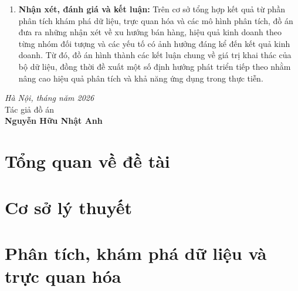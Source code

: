 \documentclass[oneside, a4paper]{book}
\theoremstyle{plain}
\theoremstyle{plain}
\theoremstyle{remark}
\theoremstyle{definition}
\theoremstyle{remark}
\begin{document}
\begin{enumerate}
		\item \textbf{Nhận xét, đánh giá và kết luận:} Trên cơ sở tổng hợp kết quả từ phần phân tích khám phá dữ liệu, trực quan hóa và các mô hình phân tích, đồ án đưa ra những nhận xét về xu hướng bán hàng, hiệu quả kinh doanh theo từng nhóm đối tượng và các yếu tố có ảnh hưởng đáng kể đến kết quả kinh doanh. Từ đó, đồ án hình thành các kết luận chung về giá trị khai thác của bộ dữ liệu, đồng thời đề xuất một số định hướng phát triển tiếp theo nhằm nâng cao hiệu quả phân tích và khả năng ứng dụng trong thực tiễn.
	\end{enumerate}
	
	
	
	\begin{minipage}{0.5\textwidth}
	\end{minipage}
	\hspace{0.5\textwidth}
	\begin{minipage}{0.5\textwidth}
		\noindent\begin{center}
			\vspace{1cm}
			\textit{Hà Nội, tháng  năm 2026} \\
			Tác giả đồ án\\ \vspace{3cm}
			\textbf{Nguyễn Hữu Nhật Anh}
		\end{center}	
	\end{minipage}
	
	
	\tableofcontents %
	
	
	\listoffigures %
	
	
	
	
	
	
	\chapter{Tổng quan về đề tài}
	
	
	\chapter{Cơ sở lý thuyết}
	
	
	\chapter{Phân tích, khám phá dữ liệu và trực quan hóa}
	
	
\end{document}
